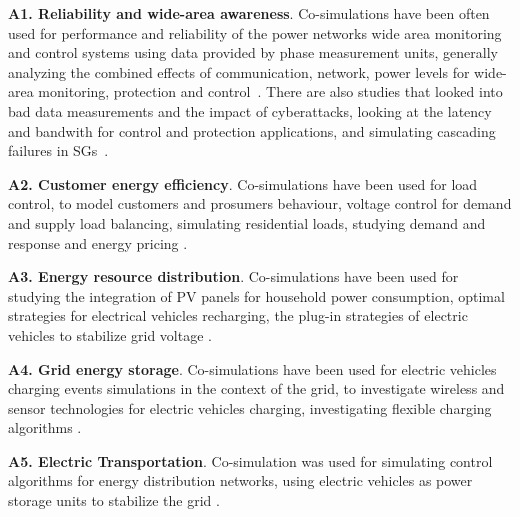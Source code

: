 \documentclass[1p]{elsarticle} %
\begin{document}
\noindent \textbf{A1. Reliability and wide-area awareness}. Co-simulations have been often used for performance and reliability of the power networks wide area monitoring and control systems using data provided by phase measurement units, generally analyzing the combined effects of communication, network, power levels for wide-area monitoring, protection and control~. There are also studies that looked into bad data measurements and the impact of cyberattacks, looking at the latency and bandwith for control and protection applications, and simulating cascading failures in SGs~.

\noindent \textbf{A2. Customer energy efficiency}. Co-simulations have been used for load control, to model customers and prosumers behaviour, voltage control for demand and supply load balancing, simulating residential loads, studying demand and response and energy pricing .

\noindent \textbf{A3. Energy resource distribution}. Co-simulations have been used for studying the integration of PV panels for household power consumption, optimal strategies for electrical vehicles recharging, the plug-in strategies of electric vehicles to stabilize grid voltage .

\noindent \textbf{A4. Grid energy storage}. Co-simulations have been used for electric vehicles charging events simulations in the context of the grid,  to investigate wireless and sensor technologies for electric vehicles charging, investigating flexible charging algorithms .

\noindent \textbf{A5. Electric Transportation}. Co-simulation was used for simulating control algorithms for energy distribution networks, using electric vehicles as power storage units to stabilize the grid .
\end{document}
